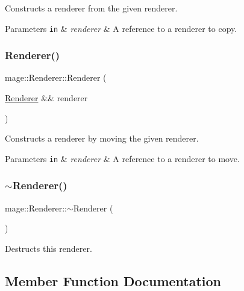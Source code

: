 Constructs a renderer from the given renderer.


\begin{DoxyParams}[1]{Parameters}
\mbox{\tt in}  & {\em renderer} & A reference to a renderer to copy. \\
\hline
\end{DoxyParams}
\hypertarget{classmage_1_1_renderer_a24a9346ca7aed427b49d0e4ed4984da3}{}\label{classmage_1_1_renderer_a24a9346ca7aed427b49d0e4ed4984da3} 
\subsubsection{\texorpdfstring{Renderer()}{Renderer()}\hspace{0.1cm}{\footnotesize\ttfamily [3/3]}}
{\footnotesize\ttfamily mage\+::\+Renderer\+::\+Renderer (\begin{DoxyParamCaption}\item[{\hyperlink{classmage_1_1_renderer}{Renderer} \&\&}]{renderer }\end{DoxyParamCaption})\hspace{0.3cm}{\ttfamily [default]}}

Constructs a renderer by moving the given renderer.


\begin{DoxyParams}[1]{Parameters}
\mbox{\tt in}  & {\em renderer} & A reference to a renderer to move. \\
\hline
\end{DoxyParams}
\hypertarget{classmage_1_1_renderer_a997e041f28cc71d069d1ab7d29fe6ced}{}\label{classmage_1_1_renderer_a997e041f28cc71d069d1ab7d29fe6ced} 
\subsubsection{\texorpdfstring{$\sim$\+Renderer()}{~Renderer()}}
{\footnotesize\ttfamily mage\+::\+Renderer\+::$\sim$\+Renderer (\begin{DoxyParamCaption}{ }\end{DoxyParamCaption})}

Destructs this renderer. 

\subsection{Member Function Documentation}
\hypertarget{classmage_1_1_renderer_ac9adf3be8c7201e4df8c5f9e049dc43d}{}\label{classmage_1_1_renderer_ac9adf3be8c7201e4df8c5f9e049dc43d} 
